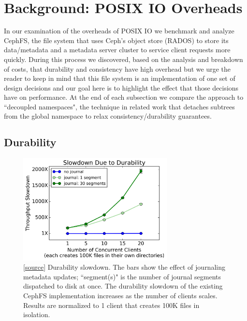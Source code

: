\section{Background: POSIX IO Overheads}
\label{sec:posix-overheads}

In our examination of the overheads of POSIX IO we benchmark and analyze
CephFS, the file system that uses Ceph's object store (RADOS) to
store its data/metadata and a metadata server cluster to service client requests
more quickly.  During this process we discovered, based on the analysis and
breakdown of costs, that durability and consistency have high overhead but we
urge the reader to keep in mind that this file system is an implementation of
one set of design decisions and our goal here is to highlight the effect that
those decisions have on performance.  At the end of each subsection we compare
the approach to ``decoupled namespaces", the technique in related work that
detaches subtrees from the global namespace to relax consistency/durability
guarantees. 


\subsection{Durability}
\label{sec:durability}

\begin{figure}[tb]
  \centering
  \includegraphics[width=0.7\textwidth]{./chapters/cudele/figures/slowdown-journal.png}
  \caption{[\href{https://github.com/michaelsevilla/cudele-popper/blob/master/experiments/baseline-durability/visualize/viz.ipynb}{source}]
  Durability slowdown. The bars show the effect of journaling metadata updates;
  ``segment(s)" is the number of journal segments dispatched to disk at once.
  The durability slowdown of the existing CephFS implementation increases as the
  number of clients scales.  Results are normalized to 1 client that creates 100K
  files in isolation. }
  \label{fig:overhead-a}
\end{figure}

